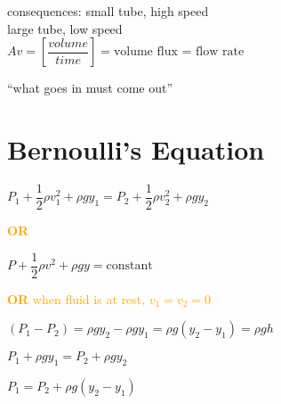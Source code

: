   \noindent consequences: small tube, high speed\\
  \hspace*{21.5mm} large tube, low speed\\

  \begin{equation*}
      Av = \left[ \frac{volume}{time} \right] = \text{volume flux = flow rate}
    \phantom{\hspace{10cm}}
  \end{equation*}

  \noindent ``what goes in must come out''

  \section*{Bernoulli's Equation}
  \begin{equation*}
      P_1 + \frac{1}{2} \rho v^2_1 + \rho g y_1 = P_2 + \frac{1}{2} \rho v^2_2 + \rho g y_2
    \phantom{\hspace{10cm}}
  \end{equation*}

  \hspace*{7mm} \noindent \textcolor{orange}{\bf{OR}}

  \begin{equation*}
      P + \frac{1}{2} \rho v^2 + \rho g y = \text{constant}
    \phantom{\hspace{12cm}}
  \end{equation*}

  \hspace*{7mm} \noindent \textcolor{orange}{\textbf{OR} when fluid is at rest, $v_1 = v_2 = 0$}

  \begin{equation*}
      (P_1 - P_2) = \rho gy_2 - \rho gy_1 = \rho g(y_2 - y_1) = \rho gh
    \phantom{\hspace{12cm}}
  \end{equation*}

  \begin{equation*}
      P_1 + \rho gy_1 = P_2 + \rho gy_2
    \phantom{\hspace{12cm}}
  \end{equation*}

  \begin{equation*}
      P_1 = P_2 + \rho g(y_2 - y_1)
    \phantom{\hspace{12cm}}
  \end{equation*}

